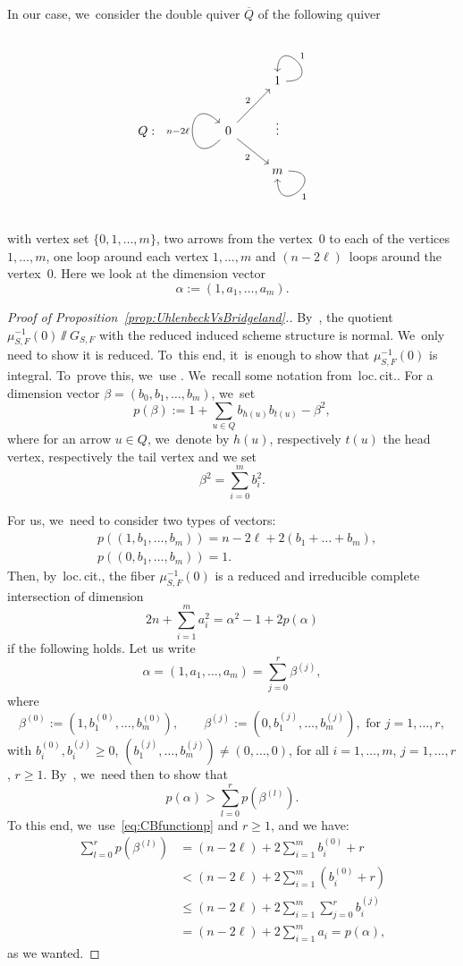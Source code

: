 In our case, we~consider the double quiver $\overline{Q}$ of the following quiver
\[
\begin{tikzcd}
&&& 1 \arrow[out=0,in=90,loop,swap,"1"]\\
Q:&& 0 \arrow[out=-135,in=135,loop,"n-2\ell"]\arrow[ur,"2"]\arrow[dr,swap,"2"]&\vdots\\
&&& m \arrow[out=0,in=-90,loop,"1"]
\end{tikzcd}
\]
with vertex set $\{0,1,\dots,m\}$, two arrows from the vertex~0 to each of the vertices $1,\dots,m$, one loop around each vertex $1,\dots,m$ and $(n-2\ell)$~loops around the vertex~0.
Here we look at the dimension vector
\[
\alpha:=(1,a_1,\dots,a_m).
\]

\begin{proof}[Proof of Proposition~\ref{prop:UhlenbeckVsBridgeland}.]
By~\cite[Th.\,1.1]{CB:normality}, the quotient $\mu^{-1}_{S,F}(0)\sslash G_{S,F}$ with the reduced induced scheme structure is normal. We~only need to show it is reduced. To~this end, it~is enough to show that $\mu^{-1}_{S,F}(0)$ is integral. To~prove this, we~use \cite{CB:geometry}. We~recall some notation from~loc.\,cit..
For a dimension vector $\beta=(b_0,b_1,\dots,b_m)$, we~set
\[
p(\beta):=1+\sum_{u\in Q} b_{h(u)}b_{t(u)} - \beta^2,
\]
where for an arrow $u\in Q$, we~denote by $h(u)$, respectively $t(u)$ the head vertex, respectively the tail vertex and we set
\[
\beta^2=\sum_{i=0}^m b_i^2.
\]

For us, we~need to consider two types of vectors:
\begin{equation}\label{eq:CBfunctionp}
\begin{split}
&p((1,b_1,\dots,b_m))=n-2\ell + 2(b_1+\dots+b_m),\\
&p((0,b_1,\dots,b_m))=1.
\end{split}
\end{equation}
Then, by~loc.\,cit., the fiber $\mu^{-1}_{S,F}(0)$ is a reduced and irreducible complete intersection of dimension
\[
2n+\sum_{i=1}^ma_i^2=\alpha^2-1+2p(\alpha)
\]
if the following holds.
Let us write
\[
\alpha=(1,a_1,\dots,a_m)=\sum_{j=0}^r \beta^{(j)},
\]
where
\[
\beta^{(0)}:=(1,b_1^{(0)},\dots,b_m^{(0)}),\qquad \beta^{(j)}:=(0,b_1^{(j)},\dots,b_m^{(j)}),\text{ for }j=1,\dots,r,
\]
with $b_i^{(0)},b_i^{(j)}\geq0$, $(b_1^{(j)},\dots,b_m^{(j)})\neq(0,\dots,0)$, for all $i=1,\dots,m$, $j=1,\dots,r$, $r\geq 1$.
By~\cite[Th.\,1.2(2)]{CB:geometry}, we~need then to show that
\[
p(\alpha)>\sum_{l=0}^rp(\beta^{(l)}).
\]
To this end, we~use~\eqref{eq:CBfunctionp} and $r\geq1$, and we have:
\[
\begin{split}
\sum_{l=0}^rp(\beta^{(l)}) & = (n-2\ell)+2\sum_{i=1}^m b_i^{(0)} + r \\
& < (n-2\ell)+2\sum_{i=1}^m (b_i^{(0)} + r) \\
& \leq (n-2\ell)+2\sum_{i=1}^m \sum_{j=0}^r b_i^{(j)}\\
& = (n-2\ell)+2\sum_{i=1}^m a_i = p(\alpha),
\end{split}
\]
as we wanted.
\end{proof}

